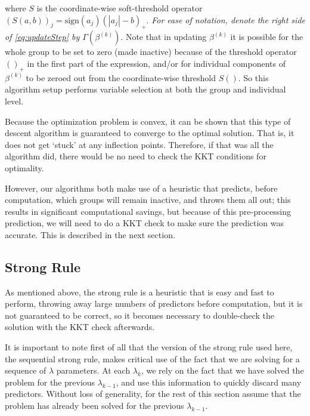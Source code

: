 \documentclass[titlepage]{article}
\begin{document}
where  $S$ is the coordinate-wise soft-threshold operator $(S(a,b))_j = \textrm{sign}(a_j)(|a_j|-b)_+$. \emph{For ease of notation, denote the right side of \autoref{eq:updateStep} by $\Gamma (\beta^{(k)})$}. Note that in updating $\beta^{(k)}$ it is possible for the whole group to be set to zero (made inactive) because of the threshold operator $()_+$ in the first part of the expression, and/or for individual components of $\beta^{(k)}$ to be zeroed out from the coordinate-wise threshold $S()$. So this algorithm setup performs variable selection at both the group and individual level.

Because the optimization problem is convex, it can be shown that this type of descent algorithm is guaranteed to converge to the optimal solution. That is, it does not get `stuck' at any inflection points. Therefore, if that was all the algorithm did, there would be no need to check the KKT conditions for optimality. 

However, our algorithms both make use of a heuristic that predicts, before computation, which groups will remain inactive, and throws them all out; this results in significant computational savings, but because of this pre-processing prediction, we will need to do a KKT check to make sure the prediction was accurate. This is described in the next section.

\subsection{Strong Rule}

As mentioned above, the strong rule \citep{tibshirani2012strong} is a heuristic that is easy and fast to perform, throwing away large numbers of predictors before computation, but it is not guaranteed to be correct, so it becomes necessary to double-check the solution with the KKT check afterwards. 

It is important to note first of all that the version of the strong rule used here, the sequential strong rule, makes critical use of the fact that we are solving for a sequence of $\lambda$ parameters. At each $\lambda_k$, we rely on the fact that we have solved the problem for the previous $\lambda_{k-1}$, and use this information to quickly discard many predictors. Without loss of generality, for the rest of this section assume that the problem has already been solved for the previous $\lambda_{k-1}$.
\end{document}
